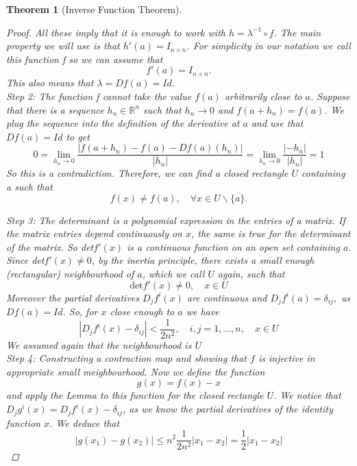 \documentclass[12pt]{article}
\def\RR{\mathbb{R}}
\newtheorem{theorem}{Theorem}[section]
\begin{document}
\begin{theorem}[Inverse Function Theorem]
\begin{proof}
All these imply that it is enough to work with $h = \lambda ^{-1} \circ f$. The main property we will
use is that $h'(a)=I_{n \times n}$. For simplicity in our notation we call this function f so we can
assume that
\[f'(a) = I_{n \times n}. \]
This also means that $\lambda = Df(a) = Id$.\\
\textit{Step 2:}
The function f cannot take the value $f(a)$ arbitrarily close to $a$. Suppose that there is a sequence $h_{n} \in \RR^n$ such that $ h_{n} \rightarrow 0$ and $f(a + h_{n}) = f(a)$. We plug the sequence into the definition of the derivative at $a$ and use that $Df(a) = Id$ to get
\[ 0 = \lim_{h_{n} \rightarrow 0}\frac{|f(a + h_{n}) - f(a) - Df(a)(h_{n})|}{|h_{n}|} = \lim_{h_{n} \rightarrow 0}\frac{|-h_{n}|}{|h_{n}|} = 1\]
So this is a contradiction. Therefore, we can find a closed rectangle $U$ containing a such
that
\[f(x) \neq f(a), \quad \forall x \in U\backslash \{a\}. \]


\textit{Step 3:} The determinant is a polynomial expression in the entries of a matrix. If the matrix entries depend continuously on $x$, the same is true for the determinant of the matrix. So det$f'(x)$ is a continuous function on an open set containing $a$. Since det$f'(x) \neq 0$, by the inertia principle, there exists a small enough (rectangular) neighbourhood of $a$, which
we call $U$ again, such that
\begin{equation}
 \text{det}f'(x) \neq 0, \quad x \in U \end{equation} 
Moreover the partial derivatives $D_{j}f^{i}(x)$ are continuous and $D_{j}f^{i}(a) = \delta_{ij},$ as $Df(a) = Id$. So, for $x$ close enough to $a$ we have
\begin{equation}
|D_{j}f^{i}(x) - \delta_{ij}| < \frac{1}{2n^{2}}, \quad i,j = 1, \dots , n, \quad x \in U
\end{equation}
We assumed again that the neighbourhood is $U$\\
\textit{Step 4:}  Constructing a contraction map and showing that $f$ is injective in appropriate small meighbourhood. Now we define the function
\[ g(x) = f(x) - x\]
and apply the Lemma to this function for the closed rectangle $U$. We notice that $D_{j}g^{i}(x) =D_{j}f^{i}(x) - \delta_{ij}$, as we know the partial derivatives of the identity function $x$. We deduce that
\begin{equation}
|g(x_{1}) - g(x_{2})| \leq n^{2}\frac{1}{2n^2}|x_{1} - x_{2}| = \frac{1}{2}|x_{1} - x_{2}| \end{equation}


\end{proof}
\end{theorem}
\end{document}
